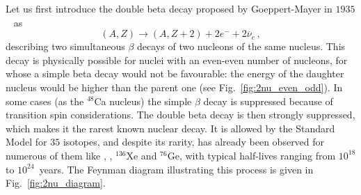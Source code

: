 Let us first introduce the double beta decay proposed by Goeppert-Mayer in $1935$~\cite{art:goeppert_1935} as
\begin{equation}
(A,Z)\rightarrow (A,Z+2)+2e^{-}+2\overline{\nu}_{e}\,,
\end{equation}
describing two simultaneous $\beta$ decays of two nucleons of the same nucleus.
This decay is physically possible for nuclei with an even-even number of nucleons, for whose a simple beta decay would not be favourable: the energy of the daughter nucleus would be higher than the parent one (see Fig.~\ref{fig:2nu_even_odd}).
In some cases (as the $^{48}$Ca nucleus) the simple $\beta$ decay is suppressed because of transition spin considerations.
The double beta decay is then strongly suppressed, which makes it the rarest known nuclear decay.
It is allowed by the Standard Model for $35$ isotopes, and despite its rarity, has already been observed for numerous of them like \Mo, \Se, $^{136}$Xe and $^{76}$Ge, with typical half-lives ranging from $10^{18}$ to $10^{24}$~years.
The Feynman diagram illustrating this process is given in Fig.~\ref{fig:2nu_diagram}.

